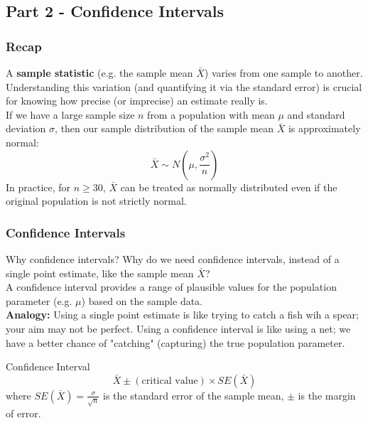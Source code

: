 \documentclass[9pt]{extarticle}
\begin{document}
\subsection{Part 2 - Confidence Intervals}
\subsubsection{Recap}
A \textbf{sample statistic} (e.g. the sample mean $\bar{X}$) varies from one sample to another. Understanding this variation (and quantifying it via the standard error) is crucial for knowing how precise (or imprecise) an estimate really is. \\[2ex]
If we have a large sample size $n$ from a population with mean $\mu$ and standard deviation $\sigma$, then our sample distribution of the sample mean $\bar{X}$ is approximately normal:
$$\bar{X} \sim N\left(\mu, \frac{\sigma^2}{n}\right)$$
In practice, for $n \geq 30$, $\bar{X}$ can be treated as normally distributed even if the original population is not strictly normal. 
\subsubsection{Confidence Intervals}
\begin{conceptbox}{Why confidence intervals?}{}
    Why do we need confidence intervals, instead of a single point estimate, like the sample mean $\bar{X}$? \\
    
    A confidence interval provides a range of plausible values for the population parameter (e.g. $\mu$) based on the sample data. \\ 
    
    \textbf{Analogy:}  Using a single point estimate is like trying to catch a fish wih a spear; your aim may not be perfect. Using a confidence interval is like using a net; we have a better chance of "catching" (capturing) the true population parameter.
\end{conceptbox}
\begin{definitionbox}{Confidence Interval}{}
  $$\bar{X} \pm (\text{critical value}) \times SE(\bar{X})$$
    where $SE(\bar{X}) = \frac{\sigma}{\sqrt{n}}$ is the standard error of the sample mean, $\pm$ is the margin of error.\\
\end{definitionbox}
\end{document}
